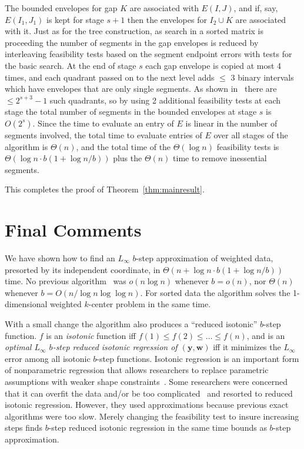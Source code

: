 \documentclass[11pt]{article}
\renewcommand{\vec}[1]{\ensuremath{\mathbf{#1}}}
\newcommand{\data}{\ensuremath{(\vec{y},\vec{w})}}
\begin{document}
The bounded envelopes for gap $K$ are associated with $E(I,J)$, and if, say, $E(I_1,J_1)$ is kept for stage $s+1$ then the envelopes for $I_2 \cup K$ are associated with it.
Just as for the tree construction, as search in a sorted matrix is proceeding the number of segments in the gap envelopes is reduced by interleaving feasibility tests based on the segment endpoint errors with tests for the basic search.
At the end of stage $s$ each gap envelope is copied at most 4 times, and each quadrant passed on to the next level adds $\leq$ 3 binary intervals which have envelopes that are only single segments.
As shown in~\cite{FredericksonJohnsonSortedMatrix} there are $\leq 2^{s+3}-1$ such quadrants, so by using 2 additional feasibility tests at each stage the total number of segments in the bounded envelopes at stage $s$ is $O(2^s)$.
Since the time to evaluate an entry of $E$ is linear in the number of segments involved, the total time to evaluate entries of $E$ over all stages of the algorithm is $\Theta(n)$, and the total time of the $\Theta(\log n)$ feasibility tests is $\Theta(\log n \cdot b(1 + \log n/b))$ plus the $\Theta(n)$ time to remove inessential segments.

This completes the proof of Theorem~\ref{thm:mainresult}.



\section{Final Comments}\label{sec:Final}

We have shown how to find an $L_\infty$ $b$-step approximation of weighted data, presorted by its independent coordinate,
in $\Theta(n + \log n \cdot b (1+\log n/b))$ time.
No previous algorithm~
\cite{ChenWangPiecewise2013,ChenWangnlogn2013,DiazBanezLinearDecide,FournierVigneronLinftyStep,FournierVigneronLinftyParametric,FulopPrillLinftyStep,GuhaShimLinftyHistogram,JQReducedIso_IF2012,KarrasetalHistogramDuality,LiuRandomizedLinftyReduced,MaysterLopezStep} 
was $o(n \log n)$ whenever $b = o(n)$, nor $\Theta(n)$ whenever $b = O(n/\log n \log\log n)$.
For sorted data the algorithm solves the 1-dimensional weighted $k$-center problem in the same time.

With a small change the algorithm also produces a ``reduced isotonic'' $b$-step function.
$f$ is an \textit{isotonic} function iff $f(1) \leq f(2) \leq \ldots \leq f(n)$, and is
an \textit{optimal $L_\infty$ $b$-step reduced isotonic regression of \data} iff it minimizes the $L_\infty$ error among all isotonic $b$-step functions.
Isotonic regression is an important form of nonparametric regression that allows researchers to replace parametric assumptions with weaker shape constraints~\cite{BarlowetalBook,RobertsonWrightDykstra}.
Some researchers were concerned that it can overfit the data and/or be too complicated~\cite{HaiminenetalReducedUnimodal,SalantiUlmReduced,SchellSingh} and resorted to reduced isotonic regression.
However, they used approximations because previous exact algorithms were too slow.
Merely changing the feasibility test to insure increasing steps finds $b$-step reduced isotonic regression in the same time bounds as $b$-step approximation.
\end{document}
